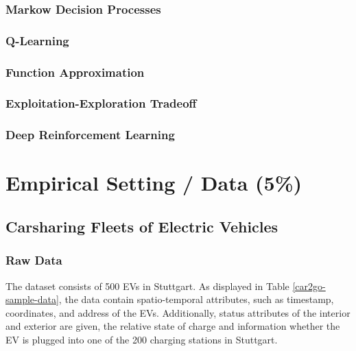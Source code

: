 \documentclass[12pt, article]{article}
\begin{document}
\subsubsection{Markow Decision Processes}
\label{sec:org9938da2}
\subsubsection{Q-Learning}
\label{sec:orgedcc844}
\subsubsection{Function Approximation}
\label{sec:org2cc8d66}
\subsubsection{Exploitation-Exploration Tradeoff}
\label{sec:org538ff1e}
\subsubsection{Deep Reinforcement Learning}
\label{sec:orga34af71}
\section{Empirical Setting / Data (5\%)}
\label{sec:org0357892}
\subsection{Carsharing Fleets of Electric Vehicles}
\label{sec:orga156fee}
\subsubsection{Raw Data}
\label{sec:orgaf86904}
The dataset consists of 500 EVs in Stuttgart. As displayed in Table
\ref{car2go-sample-data}, the data contain spatio-temporal attributes, such as
timestamp, coordinates, and address of the EVs. Additionally, status attributes
of the interior and exterior are given, the relative state of charge and
information whether the EV is plugged into one of the 200 charging stations in
Stuttgart.
\end{document}
